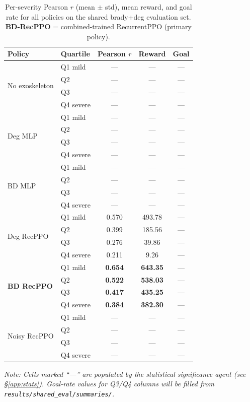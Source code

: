 \documentclass[letterpaper]{article} %
\begin{document}
\begin{table}[tbp]
  \centering
  \caption{Per-severity Pearson $r$ (mean $\pm$ std), mean reward, and goal
    rate for all policies on the shared brady+deg evaluation set.
    \textbf{BD-RecPPO} = combined-trained RecurrentPPO (primary policy).}
  \label{tab:app_severity}
  \small
  \begin{tabular}{llccc}
    \toprule
    \textbf{Policy} & \textbf{Quartile}
      & \textbf{Pearson $r$} & \textbf{Reward} & \textbf{Goal} \\
    \midrule
    \multirow{4}{*}{No exoskeleton}
      & Q1 mild  & — & —      & — \\
      & Q2       & — & —      & — \\
      & Q3       & — & —      & — \\
      & Q4 severe& — & —      & — \\
    \midrule
    \multirow{4}{*}{Deg MLP}
      & Q1 mild  & — & —      & — \\
      & Q2       & — & —      & — \\
      & Q3       & — & —      & — \\
      & Q4 severe& — & —      & — \\
    \midrule
    \multirow{4}{*}{BD MLP}
      & Q1 mild  & — & —      & — \\
      & Q2       & — & —      & — \\
      & Q3       & — & —      & — \\
      & Q4 severe& — & —      & — \\
    \midrule
    \multirow{4}{*}{Deg RecPPO}
      & Q1 mild  & 0.570 & 493.78 & — \\
      & Q2       & 0.399 & 185.56 & — \\
      & Q3       & 0.276 &  39.86 & — \\
      & Q4 severe& 0.211 &   9.26 & — \\
    \midrule
    \multirow{4}{*}{\textbf{BD RecPPO}}
      & Q1 mild  & \textbf{0.654} & \textbf{643.35} & — \\
      & Q2       & \textbf{0.522} & \textbf{538.03} & — \\
      & Q3       & \textbf{0.417} & \textbf{435.25} & — \\
      & Q4 severe& \textbf{0.384} & \textbf{382.30} & — \\
    \midrule
    \multirow{4}{*}{Noisy RecPPO}
      & Q1 mild  & — & — & — \\
      & Q2       & — & — & — \\
      & Q3       & — & — & — \\
      & Q4 severe& — & — & — \\
    \bottomrule
  \end{tabular}
  \vspace{0.4em}

  \small\textit{Note: Cells marked ``—'' are populated by the statistical
  significance agent (see \S\ref{app:stats}).  Goal-rate values for Q3/Q4
  columns will be filled from \texttt{results/shared\_eval/summaries/}.}
\end{table}
\end{document}
